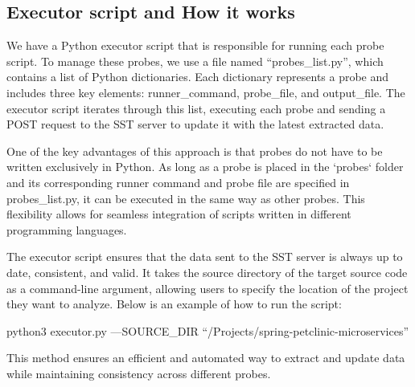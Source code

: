 \subsection{Executor script and How it works}

We have a Python executor script that is responsible for running each probe script. To manage these probes, we use a file named ``probes\_list.py'', which contains a list of Python dictionaries. Each dictionary represents a probe and includes three key elements: runner\_command, probe\_file, and output\_file. The executor script iterates through this list, executing each probe and sending a POST request to the SST server to update it with the latest extracted data.  

One of the key advantages of this approach is that probes do not have to be written exclusively in Python. As long as a probe is placed in the `probes` folder and its corresponding runner command and probe file are specified in probes\_list.py, it can be executed in the same way as other probes. This flexibility allows for seamless integration of scripts written in different programming languages.  

The executor script ensures that the data sent to the SST server is always up to date, consistent, and valid. It takes the source directory of the target source code as a command-line argument, allowing users to specify the location of the project they want to analyze. Below is an example of how to run the script:

\begin{tcolorbox}[colback=gray!10, colframe=gray!20]
	python3 executor.py ---SOURCE\_DIR ``/Projects/spring-petclinic-microservices''
\end{tcolorbox}

This method ensures an efficient and automated way to extract and update data while maintaining consistency across different probes.